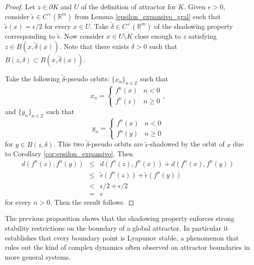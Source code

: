\documentclass{amsart}
\newcommand{\R}{{\mathbb{R}}}
\newcommand{\Z}{{\mathbb{Z}}}
\begin{document}
	\begin{proof}
	Let $z\in \partial K$ and  $U$ of the definition of attractor for  $K$.
	Given $\epsilon>0$, consider  $\tilde{\epsilon}\in C^+(\R^m)$ from  Lemma \ref{epsilon_expansivo_gral} such that $\tilde{\epsilon}(x)=\epsilon/2$ for every $x\in U$. Take $\tilde{\delta}\in C^+(\R^m)$ of the shadowing property corresponding to  $\tilde{\epsilon}$.
	Now consider $x\in U\setminus K$ close enough to $z$ satisfying $z\in B(x, \tilde \delta(x))$. %
	Note that there exists $\delta>0$ such that $B(z, \delta)\subset B(x,\tilde{\delta}(x))$. 
	
	Take the following $\tilde{\delta}$-pseudo orbits: 	$\{x_n\}_{n\in\Z}$ such that $$x_n=\begin{cases} f^n(x) &n<  0\\ f^{n}(z) & n\geq 0 \end{cases},$$  and $\{y_n\}_{n\in \Z}$ such that  $$y_n=\begin{cases} f^n(x) & n<0\\  f^{n}(y) &n\geq0\end{cases}$$ for  $y\in B(z,\delta)$. %
	This two $\tilde{\delta}$-pseudo orbits are $\tilde{\epsilon}$-shadowed by the orbit of $x$ due to Corollary  \ref{cor:epsilon_expansivo}. Then 
	\begin{eqnarray*} d(f^{n}(z), f^{n}(y))&\leq &d(f^n(z), f^{n}(x))+d(f^{n}(x), f^{n}(y))\\&\leq&\tilde{\epsilon}(f^n(z))+\tilde{\epsilon}(f^n(y))\\&<&\epsilon/2+\epsilon/2\\ &=&\epsilon\end{eqnarray*}  for every $n>0$.  Then  the result follows.
	\end{proof}
	
	The previous proposition  shows that the shadowing property enforces strong stability restrictions on the boundary of a global attractor.  
	In particular it establishes that every boundary point is Lyapunov stable, a phenomenon that rules out the kind of complex dynamics often observed on attractor boundaries in more general systems.
	
\end{document}
